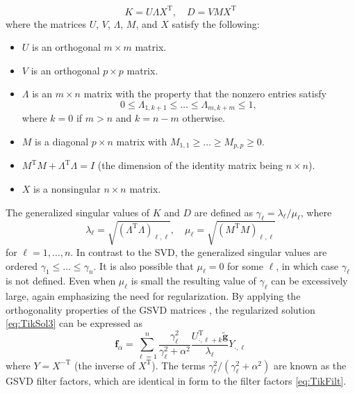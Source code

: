 \documentclass[12pt,notitlepage]{report}
\newcommand{\gnoiseVec}{\widetilde{\mathbf{g}}}	%
\newcommand{\kMat}{K}	%
\newcommand{\fVec}{\mathbf{f}}	%
\newcommand{\trans}{\mathrm{T}}	%
\newcommand{\regparam}{\alpha}
\begin{document}
\begin{equation}
\label{eq:GSVD matrices}
\kMat = U\Lambda X^\trans, \quad D = VMX^\trans
\end{equation}
where the matrices $U$, $V$, $\Lambda$, $M$, and $X$ satisfy the following: 
\begin{itemize}
\item $U$ is an orthogonal $m \times m$ matrix. 
\item $V$ is an orthogonal $p \times p$ matrix.
\item $\Lambda$ is an $m \times n$ matrix with the property that the nonzero entries satisfy
\[0 \leq \Lambda_{1,k+1} \leq \ldots \leq \Lambda_{m,k+m} \leq 1,\]
where $k = 0$ if $m > n$ and $k = n-m$ otherwise. 
\item $M$ is a diagonal $p \times n$ matrix with $M_{1,1} \geq \ldots \geq M_{p,p} \geq 0.$
\item $M^\trans M + \Lambda^\trans \Lambda = I$ (the dimension of the identity matrix being $n \times n$).
\item $X$ is a nonsingular $n \times n$ matrix.
\end{itemize}
The generalized singular values of $\kMat$ and $D$ are defined as $\gamma_\ell = \lambda_{\ell}/\mu_{\ell}$, where
\begin{equation}
\label{eq:GSVD lambda}
\lambda_\ell = \sqrt{(\Lambda^\trans \Lambda)_{\ell,\ell}}, \quad \mu_\ell = \sqrt{(M^\trans M)_{\ell,\ell}}
\end{equation}
for $\ell = 1,\ldots,n$. In contrast to the SVD, the generalized singular values are ordered $\gamma_1 \leq \ldots \leq \gamma_n$. It is also possible that $\mu_\ell = 0$ for some $\ell$, in which case $\gamma_\ell$ is not defined. Even when $\mu_\ell$ is small the resulting value of $\gamma_\ell$ can be excessively large, again emphasizing the need for regularization. By applying the orthogonality properties of the GSVD matrices \cite[p.~105-106]{ABT}, the regularized solution \eqref{eq:TikSol3} can be expressed as
\begin{equation}
\label{eq:TikSol GSVD}
\fVec_\regparam = \sum_{\ell=1}^n \frac{\gamma_\ell^2}{\gamma_\ell^2 + \regparam^2} \frac{U_{\cdot,\ell+k}^\trans\gnoiseVec}{\lambda_\ell}Y_{\cdot,\ell}
\end{equation}
where $Y = X^{-\trans}$ (the inverse of $X^\trans$). The terms $\gamma_\ell^2/(\gamma_\ell^2 + \regparam^2)$ are known as the GSVD filter factors, which are identical in form to the filter factors \eqref{eq:TikFilt}. \par 
\end{document}
